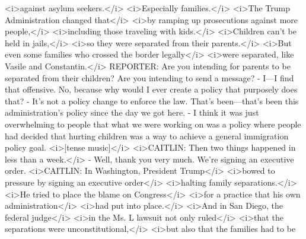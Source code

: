 \begin{itemize}
\begin{itemize}
    \textless{}i\textgreater{}against asylum
    seekers.\textless{}/i\textgreater{}
    \textless{}i\textgreater{}Especially
    families.\textless{}/i\textgreater{} \textless{}i\textgreater{}The
    Trump Administration changed that\textless{}/i\textgreater{}
    \textless{}i\textgreater{}by ramping up prosecutions against more
    people,\textless{}/i\textgreater{}
    \textless{}i\textgreater{}including those traveling with
    kids.\textless{}/i\textgreater{} \textless{}i\textgreater{}Children
    can't be held in jails,\textless{}/i\textgreater{}
    \textless{}i\textgreater{}so they were separated from their
    parents.\textless{}/i\textgreater{} \textless{}i\textgreater{}But
    even some families who crossed the border
    legally\textless{}/i\textgreater{} \textless{}i\textgreater{}were
    separated, like Vasile and Constantin.\textless{}/i\textgreater{}
    REPORTER: Are you intending for parents to be separated from their
    children? Are you intending to send a message? - I---I find that
    offensive. No, because why would I ever create a policy that
    purposely does that? - It's not a policy change to enforce the law.
    That's been---that's been this administration's policy since the day
    we got here. - I think it was just overwhelming to people that what
    we were working on was a policy where people had decided that
    hurting children was a way to achieve a general immigration policy
    goal. \textless{}i\textgreater{}{[}tense
    music{]}\textless{}/i\textgreater{}
    \textless{}i\textgreater{}CAITLIN: Then two things happened in less
    than a week.\textless{}/i\textgreater{} - Well, thank you very much.
    We're signing an executive order. \textless{}i\textgreater{}CAITLIN:
    In Washington, President Trump\textless{}/i\textgreater{}
    \textless{}i\textgreater{}bowed to pressure by signing an executive
    order\textless{}/i\textgreater{} \textless{}i\textgreater{}halting
    family separations.\textless{}/i\textgreater{}
    \textless{}i\textgreater{}He tried to place the blame on
    Congress\textless{}/i\textgreater{} \textless{}i\textgreater{}for a
    practice that his own administration\textless{}/i\textgreater{}
    \textless{}i\textgreater{}had put into
    place.\textless{}/i\textgreater{} \textless{}i\textgreater{}And in
    San Diego, the federal judge\textless{}/i\textgreater{}
    \textless{}i\textgreater{}in the Ms. L lawsuit not only
    ruled\textless{}/i\textgreater{} \textless{}i\textgreater{}that the
    separations were unconstitutional,\textless{}/i\textgreater{}
    \textless{}i\textgreater{}but also that the families had to be

\end{itemize}
\end{itemize}
